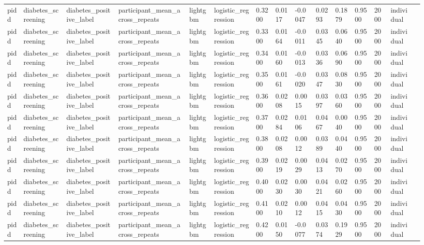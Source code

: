 \begin{tabular}{lllllllllllllll}
pidd & diabetes\_screening & diabetes\_positive\_label & participant\_mean\_across\_repeats & lightgbm & logistic\_regression & 0.3200 & 0.0117 & -0.0047 & 0.0293 & 0.1879 & 0.9500 & 2000 & individual &  \\
pidd & diabetes\_screening & diabetes\_positive\_label & participant\_mean\_across\_repeats & lightgbm & logistic\_regression & 0.3300 & 0.0164 & -0.0011 & 0.0345 & 0.0640 & 0.9500 & 2000 & individual &  \\
pidd & diabetes\_screening & diabetes\_positive\_label & participant\_mean\_across\_repeats & lightgbm & logistic\_regression & 0.3400 & 0.0160 & -0.0013 & 0.0336 & 0.0690 & 0.9500 & 2000 & individual &  \\
pidd & diabetes\_screening & diabetes\_positive\_label & participant\_mean\_across\_repeats & lightgbm & logistic\_regression & 0.3500 & 0.0161 & -0.0020 & 0.0347 & 0.0830 & 0.9500 & 2000 & individual &  \\
pidd & diabetes\_screening & diabetes\_positive\_label & participant\_mean\_across\_repeats & lightgbm & logistic\_regression & 0.3600 & 0.0208 & 0.0015 & 0.0397 & 0.0360 & 0.9500 & 2000 & individual &  \\
pidd & diabetes\_screening & diabetes\_positive\_label & participant\_mean\_across\_repeats & lightgbm & logistic\_regression & 0.3700 & 0.0284 & 0.0106 & 0.0467 & 0.0040 & 0.9500 & 2000 & individual &  \\
pidd & diabetes\_screening & diabetes\_positive\_label & participant\_mean\_across\_repeats & lightgbm & logistic\_regression & 0.3800 & 0.0208 & 0.0012 & 0.0389 & 0.0440 & 0.9500 & 2000 & individual &  \\
pidd & diabetes\_screening & diabetes\_positive\_label & participant\_mean\_across\_repeats & lightgbm & logistic\_regression & 0.3900 & 0.0219 & 0.0029 & 0.0413 & 0.0270 & 0.9500 & 2000 & individual &  \\
pidd & diabetes\_screening & diabetes\_positive\_label & participant\_mean\_across\_repeats & lightgbm & logistic\_regression & 0.4000 & 0.0230 & 0.0030 & 0.0421 & 0.0260 & 0.9500 & 2000 & individual &  \\
pidd & diabetes\_screening & diabetes\_positive\_label & participant\_mean\_across\_repeats & lightgbm & logistic\_regression & 0.4100 & 0.0210 & 0.0012 & 0.0415 & 0.0430 & 0.9500 & 2000 & individual &  \\
pidd & diabetes\_screening & diabetes\_positive\_label & participant\_mean\_across\_repeats & lightgbm & logistic\_regression & 0.4200 & 0.0150 & -0.0077 & 0.0374 & 0.1929 & 0.9500 & 2000 & individual &  \\

\end{tabular}
